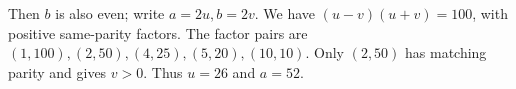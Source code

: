 Then $b$ is also even; write $a=2u,b=2v$. We have $(u-v)(u+v)=100$, with positive same-parity factors. The factor pairs are $(1,100),(2,50),(4,25),(5,20),(10,10)$. Only $(2,50)$ has matching parity and gives $v>0$. Thus $u=26$ and $\boxed{a=52}$.
